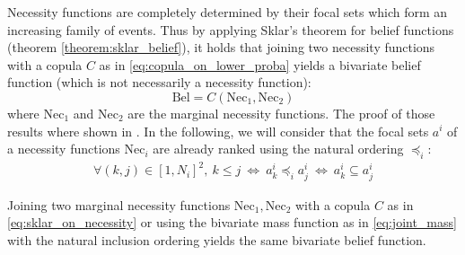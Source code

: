 Necessity functions are completely determined by their focal sets which form an increasing family of events. Thus by applying Sklar's theorem for belief functions (theorem \ref{theorem:sklar_belief}), it holds that joining two necessity functions with a copula $C$ as in \eqref{eq:copula_on_lower_proba} yields a bivariate belief function (which is not necessarily a necessity function):
\begin{equation}
    \mathrm{Bel} = C(\mathrm{Nec}_1, \mathrm{Nec}_2)\label{eq:sklar_on_necessity}
\end{equation}
where $\mathrm{Nec}_1$ and $\mathrm{Nec}_2$ are the marginal necessity functions. The proof of those results where shown in \cite{schmelzer_joint_2015,schmelzer_sklars_2015}. In the following, we will consider that the focal sets $a^i$ of a necessity functions $\mathrm{Nec}_i$ are already ranked using the natural ordering $\preceq_i$:
\begin{eqnarray}
    \forall (k,j)\in[1, N_i]^2,~k\leqslant j ~\Leftrightarrow ~ a^i_k \preceq_i a^i_j ~\Leftrightarrow ~ a^i_k\subseteq a^i_j
\end{eqnarray}

\begin{proposition}\label{prop:sklar_necessity}
    Joining two marginal necessity functions $\mathrm{Nec}_1, \mathrm{Nec}_2$ with a copula $C$ as in \eqref{eq:sklar_on_necessity} or using the bivariate mass function as in \eqref{eq:joint_mass} with the natural inclusion ordering yields the same bivariate belief function.
\end{proposition}

